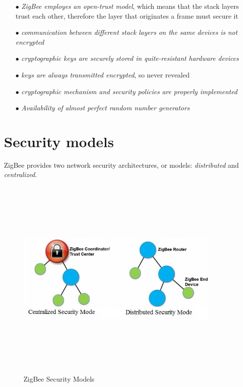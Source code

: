 \documentclass[12pt]{report}
\begin{document}
{\begin{itemize}
\setlength{\itemindent}{+4mm}
\item[$\bullet$] \emph{ZigBee employes an open-trust model}, which means that the stack layers trust each other, therefore the layer that originates a frame must secure it
\item[$\bullet$] \emph{communication between different stack layers on the same devices is not encrypted}
\item[$\bullet$] \emph{cryptographic keys are securely stored in quite-resistant hardware devices}
\item[$\bullet$] \emph{keys are always transmitted encrypted}, so never revealed
\item[$\bullet$] \emph{cryptographic mechanism and security policies are properly implemented}
\item[$\bullet$] \emph{Availability of almost perfect random number generators}\\
\end{itemize}

\clearpage
\section{Security models}
\bigskip

ZigBee provides two network security architectures, or models: \emph{distributed} and \emph{centralized}.\\

\begin{figure}[H]
\includegraphics[width=10cm,height=10cm,keepaspectratio]{security_models}
\centering
\caption{ZigBee Security Models}
\end{figure}

}
\end{document}
